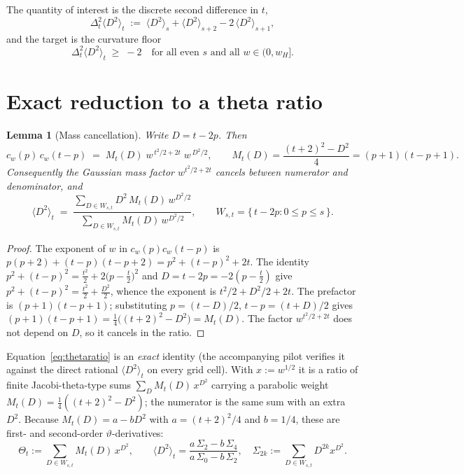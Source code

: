 \documentclass[11pt]{article}
\newtheorem{lemma}{Lemma}
\theoremstyle{definition}
\newcommand{\Dsq}{\langle D^2\rangle}
\begin{document}
The quantity of interest is the discrete second difference in $t$,
\[
  \Delta^2_t\Dsq_t \;:=\; \Dsq_s+\Dsq_{s+2}-2\,\Dsq_{s+1},
\]
and the target is the curvature floor
\begin{equation}\label{eq:floor}
  \boxed{\;\Delta^2_t\Dsq_t \;\ge\; -2\quad\text{for all even }s\text{ and all }w\in(0,w_H].\;}
\end{equation}

\section{Exact reduction to a theta ratio}

\begin{lemma}[Mass cancellation]\label{lem:mass}
Write $D=t-2p$. Then
\[
  c_w(p)\,c_w(t-p)
  \;=\; M_t(D)\;w^{\,t^2/2+2t}\;w^{\,D^2/2},
  \qquad
  M_t(D)=\frac{(t+2)^2-D^2}{4}=(p+1)(t-p+1).
\]
Consequently the Gaussian mass factor $w^{t^2/2+2t}$ cancels between numerator
and denominator, and
\begin{equation}\label{eq:thetaratio}
  \Dsq_t \;=\;
  \frac{\displaystyle\sum_{D\in W_{s,t}} D^2\,M_t(D)\,w^{D^2/2}}
       {\displaystyle\sum_{D\in W_{s,t}} M_t(D)\,w^{D^2/2}},
  \qquad
  W_{s,t}=\{\,t-2p : 0\le p\le s\,\}.
\end{equation}
\end{lemma}

\begin{proof}
The exponent of $w$ in $c_w(p)c_w(t-p)$ is
$p(p+2)+(t-p)(t-p+2)=p^2+(t-p)^2+2t$. The identity
$p^2+(t-p)^2=\tfrac{t^2}{2}+2\bigl(p-\tfrac t2\bigr)^2$ and
$D=t-2p=-2(p-\tfrac t2)$ give $p^2+(t-p)^2=\tfrac{t^2}{2}+\tfrac{D^2}{2}$, whence
the exponent is $t^2/2+D^2/2+2t$. The prefactor is
$(p+1)(t-p+1)$; substituting $p=(t-D)/2$, $t-p=(t+D)/2$ gives
$(p+1)(t-p+1)=\tfrac14\bigl((t+2)^2-D^2\bigr)=M_t(D)$. The factor
$w^{t^2/2+2t}$ does not depend on $D$, so it cancels in the ratio.
\end{proof}

Equation~\eqref{eq:thetaratio} is an \emph{exact} identity (the accompanying
pilot verifies it against the direct rational $\Dsq_t$ on every grid cell). With
$x:=w^{1/2}$ it is a ratio of finite Jacobi-theta-type sums
$\sum_D M_t(D)\,x^{D^2}$ carrying a parabolic weight
$M_t(D)=\tfrac14((t+2)^2-D^2)$; the numerator is the same sum with an extra
$D^2$. Because $M_t(D)=a-bD^2$ with $a=(t+2)^2/4$ and $b=1/4$, these are
first- and second-order $\vartheta$-derivatives:
\[
  \Theta_t:=\sum_{D\in W_{s,t}}M_t(D)\,x^{D^2},\qquad
  \Dsq_t=\frac{a\,\Sigma_2-b\,\Sigma_4}{a\,\Sigma_0-b\,\Sigma_2},\quad
  \Sigma_{2k}:=\sum_{D\in W_{s,t}}D^{2k}x^{D^2}.
\]
\end{document}
